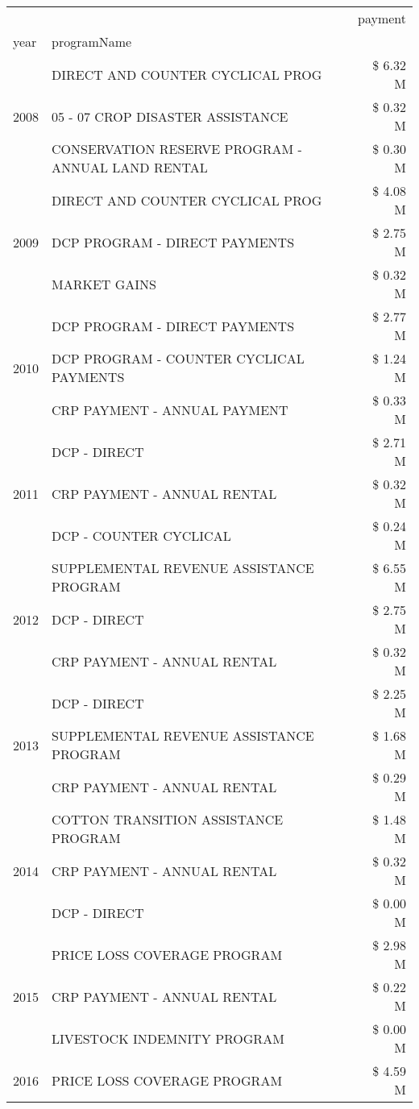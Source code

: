 \begin{tabular}{llr}
\toprule
 &  & payment \\
year & programName &  \\
\midrule
\multirow[t]{3}{*}{2008} & DIRECT AND COUNTER CYCLICAL PROG & \$ 6.32 M \\
 & 05 - 07 CROP DISASTER ASSISTANCE & \$ 0.32 M \\
 & CONSERVATION RESERVE PROGRAM - ANNUAL LAND RENTAL & \$ 0.30 M \\
\cline{1-3}
\multirow[t]{3}{*}{2009} & DIRECT AND COUNTER CYCLICAL PROG & \$ 4.08 M \\
 & DCP PROGRAM - DIRECT PAYMENTS & \$ 2.75 M \\
 & MARKET GAINS & \$ 0.32 M \\
\cline{1-3}
\multirow[t]{3}{*}{2010} & DCP PROGRAM - DIRECT PAYMENTS & \$ 2.77 M \\
 & DCP PROGRAM - COUNTER CYCLICAL PAYMENTS & \$ 1.24 M \\
 & CRP PAYMENT - ANNUAL PAYMENT & \$ 0.33 M \\
\cline{1-3}
\multirow[t]{3}{*}{2011} & DCP - DIRECT & \$ 2.71 M \\
 & CRP PAYMENT - ANNUAL RENTAL & \$ 0.32 M \\
 & DCP - COUNTER CYCLICAL & \$ 0.24 M \\
\cline{1-3}
\multirow[t]{3}{*}{2012} & SUPPLEMENTAL REVENUE ASSISTANCE PROGRAM & \$ 6.55 M \\
 & DCP - DIRECT & \$ 2.75 M \\
 & CRP PAYMENT - ANNUAL RENTAL & \$ 0.32 M \\
\cline{1-3}
\multirow[t]{3}{*}{2013} & DCP - DIRECT & \$ 2.25 M \\
 & SUPPLEMENTAL REVENUE ASSISTANCE PROGRAM & \$ 1.68 M \\
 & CRP PAYMENT - ANNUAL RENTAL & \$ 0.29 M \\
\cline{1-3}
\multirow[t]{3}{*}{2014} & COTTON TRANSITION ASSISTANCE PROGRAM & \$ 1.48 M \\
 & CRP PAYMENT - ANNUAL RENTAL & \$ 0.32 M \\
 & DCP - DIRECT & \$ 0.00 M \\
\cline{1-3}
\multirow[t]{3}{*}{2015} & PRICE LOSS COVERAGE PROGRAM & \$ 2.98 M \\
 & CRP PAYMENT - ANNUAL RENTAL & \$ 0.22 M \\
 & LIVESTOCK INDEMNITY PROGRAM & \$ 0.00 M \\
\cline{1-3}
\multirow[t]{3}{*}{2016} & PRICE LOSS COVERAGE PROGRAM & \$ 4.59 M \\

\end{tabular}
